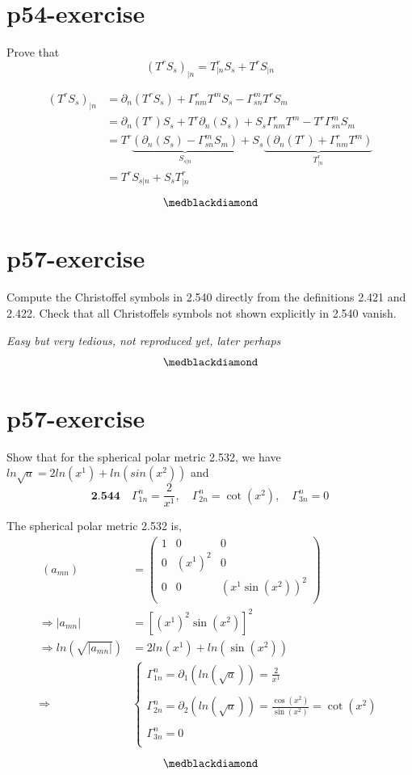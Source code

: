 \section{p54-exercise}
\begin{tcolorbox}
Prove that $$(T^rS_s)_{|n} = T^r_{|n}S_s+T^rS_{|n}$$
\end{tcolorbox}
\begin{align} (T^rS_s)_{|n} &=  \partial_n(T^rS_s) + \Gamma^r_{nm}T^mS_s - \Gamma^m_{sn}T^rS_m\\
\ &=  \partial_n(T^r)S_s+ T^r\partial_n(S_s) + S_s\Gamma^r_{nm}T^m - T^r\Gamma^m_{sn}S_m\\
\ &=  T^r\underbrace{(\partial_n(S_s) - \Gamma^m_{sn}S_m)}_{S_{s|n}}+S_s\underbrace{(\partial_n(T^r)+ \Gamma^r_{nm}T^m)}_{T^r_{|n}}\\
\ &=  T^rS_{s|n}+S_sT^r_{|n}
\end{align}
$$\medblackdiamond$$
\newpage

\section{p57-exercise}
\begin{tcolorbox}
Compute the Christoffel symbols in 2.540 directly from the definitions 2.421 and 2.422. Check that all Christoffels symbols not shown explicitly in 2.540 vanish.
\end{tcolorbox}
\textit{Easy but very tedious, not reproduced yet, later perhaps}
$$\medblackdiamond$$
\newpage

\section{p57-exercise}
\begin{tcolorbox}
Show that for the spherical polar metric 2.532, we have $ln\sqrt{a} = 2 ln(x^1)+ln(sin(x^2))$ and 
$$\textbf{2.544}\quad \Gamma^n_{1n} = \frac{2}{x^1},\quad \Gamma^n_{2n} = \cot (x^2),\quad\Gamma^n_{3n} =0$$
\end{tcolorbox}
The spherical polar metric 2.532 is,
\begin{align}
\ (a_{mn})&= \begin{pmatrix}
 1& 0 & 0 \\
 0& (x^1)^2 & 0 \\
 0& 0 & (x^1 \sin (x^2))^2 \\
\end{pmatrix}\\
\Rightarrow |a_{mn}| &= \left[(x^1)^2 \sin (x^2)\right]^2\\
\Rightarrow ln(\sqrt{|a_{mn}|}) &= 2ln(x^1)+ln(\sin (x^2))\\
\Rightarrow\quad\quad &\left \{\begin{array}{c}
\Gamma^n_{1n} = \partial_1(ln(\sqrt{a})) = \frac{2}{x^1}\\\\
\Gamma^n_{2n} = \partial_2(ln(\sqrt{a})) = \frac{\cos(x^2)}{\sin(x^2)} =  \cot (x^2)\\\\
\Gamma^n_{3n} = 0\\
\end{array}\right.
\end{align} 
$$\medblackdiamond$$
\newpage

